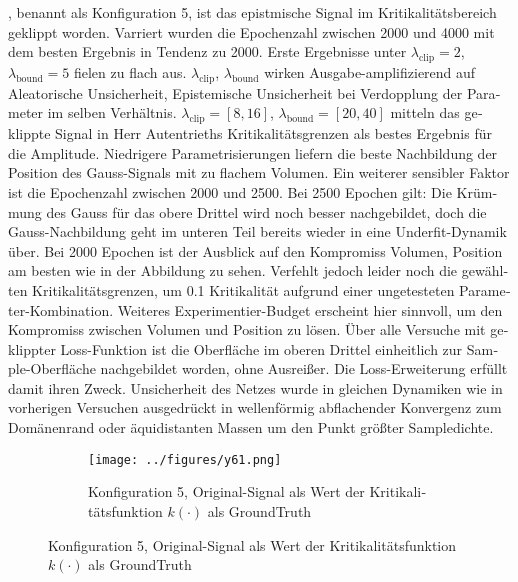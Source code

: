 \begin{otherlanguage}{ngerman}
, benannt als Konfiguration 5, ist das epistmische Signal im Kritikalitätsbereich geklippt worden. Varriert wurden die Epochenzahl zwischen 2000 und 4000 mit dem besten Ergebnis in Tendenz zu 2000. Erste Ergebnisse unter $\lambda_{\text{clip}}=2$, $\lambda_{\text{bound}}=5$ fielen zu flach aus. $\lambda_{\text{clip}}$, $\lambda_{\text{bound}}$ wirken Ausgabe-amplifizierend auf \gls{Aleatorische Unsicherheit}, \gls{Epistemische Unsicherheit} bei Verdopplung der Parameter im selben Verhältnis. $\lambda_{\text{clip}}=[8, 16]$, $\lambda_{\text{bound}}=[20, 40]$ mitteln das geklippte Signal in Herr Autentrieths Kritikalitätsgrenzen als bestes Ergebnis für die Amplitude. Niedrigere Parametrisierungen liefern die beste Nachbildung der Position des Gauss-Signals mit zu flachem Volumen. Ein weiterer sensibler Faktor ist die Epochenzahl zwischen 2000 und 2500. Bei 2500 Epochen gilt: Die Krümmung des Gauss für das obere Drittel wird noch besser nachgebildet, doch die Gauss-Nachbildung geht im unteren Teil bereits wieder in eine Underfit-Dynamik über. Bei 2000 Epochen ist der Ausblick auf den Kompromiss Volumen, Position am besten wie in der Abbildung zu sehen. Verfehlt jedoch leider noch die gewählten Kritikalitätsgrenzen, um 0.1 Kritikalität aufgrund einer ungetesteten Parameter-Kombination. Weiteres Experimentier-Budget erscheint hier sinnvoll, um den Kompromiss zwischen Volumen und Position zu lösen. Über alle Versuche mit geklippter Loss-Funktion ist die Oberfläche im oberen Drittel einheitlich zur Sample-Oberfläche nachgebildet worden, ohne Ausreißer. Die Loss-Erweiterung erfüllt damit ihren Zweck. Unsicherheit des Netzes wurde in gleichen Dynamiken wie in vorherigen Versuchen ausgedrückt in wellenförmig abflachender Konvergenz zum Domänenrand oder äquidistanten Massen um den Punkt größter Sampledichte.


\begin{figure}[!ht]
  \centering

  \begin{subfigure}[t]{\textwidth}
    \centering
    \texttt{[image: ../figures/y61.png]}
    \caption{Konfiguration 5, Original-Signal als Wert der Kritikalitätsfunktion \(k(\cdot)\) als \gls{GroundTruth}}
    \label{fig:bild31}
  \end{subfigure}



\end{figure}
\end{otherlanguage}
